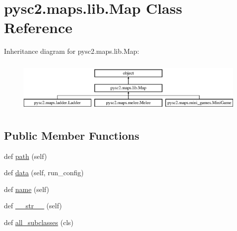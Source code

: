 \hypertarget{classpysc2_1_1maps_1_1lib_1_1_map}{}\section{pysc2.\+maps.\+lib.\+Map Class Reference}
\label{classpysc2_1_1maps_1_1lib_1_1_map}
Inheritance diagram for pysc2.\+maps.\+lib.\+Map\+:\begin{figure}[H]
\begin{center}
\leavevmode
\includegraphics[height=2.592592cm]{classpysc2_1_1maps_1_1lib_1_1_map}
\end{center}
\end{figure}
\subsection*{Public Member Functions}
\begin{DoxyCompactItemize}
\item 
def \mbox{\hyperlink{classpysc2_1_1maps_1_1lib_1_1_map_a6d5499d1d1f2c0aaedbf7b7787a8ba05}{path}} (self)
\item 
def \mbox{\hyperlink{classpysc2_1_1maps_1_1lib_1_1_map_a07aee252bcbdc30771a9160cc7b604d1}{data}} (self, run\+\_\+config)
\item 
def \mbox{\hyperlink{classpysc2_1_1maps_1_1lib_1_1_map_afdbca854775c5c09c0ce09f0a532261b}{name}} (self)
\item 
def \mbox{\hyperlink{classpysc2_1_1maps_1_1lib_1_1_map_a7c2eff51fb8cf13b42fa0cfe39bd02c2}{\+\_\+\+\_\+str\+\_\+\+\_\+}} (self)
\item 
def \mbox{\hyperlink{classpysc2_1_1maps_1_1lib_1_1_map_a9c1ce36a2df01702d5b30e3189f5b565}{all\+\_\+subclasses}} (cls)
\end{DoxyCompactItemize}
